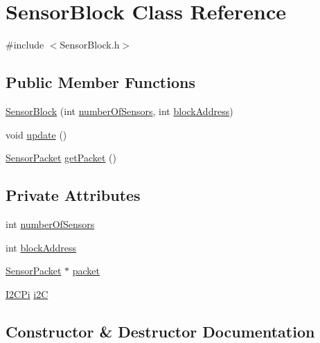 \hypertarget{class_sensor_block}{}\section{Sensor\+Block Class Reference}
\label{class_sensor_block}


{\ttfamily \#include $<$Sensor\+Block.\+h$>$}

\subsection*{Public Member Functions}
\begin{DoxyCompactItemize}
\item 
\mbox{\hyperlink{class_sensor_block_a858a87b528e1fd2ce09368446ac83d4a}{Sensor\+Block}} (int \mbox{\hyperlink{class_sensor_block_a323076089f7227ca2d5a50be10538f1b}{number\+Of\+Sensors}}, int \mbox{\hyperlink{class_sensor_block_aba53bd5cc52d416a9fed2b8ca57647ba}{block\+Address}})
\item 
void \mbox{\hyperlink{class_sensor_block_a8210999358ea8db5961b9c9c56128a8b}{update}} ()
\item 
\mbox{\hyperlink{class_sensor_packet}{Sensor\+Packet}} \mbox{\hyperlink{class_sensor_block_a139f31b82ef60a0dc64cfdd2208c565f}{get\+Packet}} ()
\end{DoxyCompactItemize}
\subsection*{Private Attributes}
\begin{DoxyCompactItemize}
\item 
int \mbox{\hyperlink{class_sensor_block_a323076089f7227ca2d5a50be10538f1b}{number\+Of\+Sensors}}
\item 
int \mbox{\hyperlink{class_sensor_block_aba53bd5cc52d416a9fed2b8ca57647ba}{block\+Address}}
\item 
\mbox{\hyperlink{class_sensor_packet}{Sensor\+Packet}} $\ast$ \mbox{\hyperlink{class_sensor_block_a7400a743ef512ca008cd1cebc9a3856e}{packet}}
\item 
\mbox{\hyperlink{class_i2_c_pi}{I2\+C\+Pi}} \mbox{\hyperlink{class_sensor_block_ae7627da0b0154d28327756ffa0883281}{i2C}}
\end{DoxyCompactItemize}


\subsection{Constructor \& Destructor Documentation}
\mbox{\label{class_sensor_block_a858a87b528e1fd2ce09368446ac83d4a}} 
